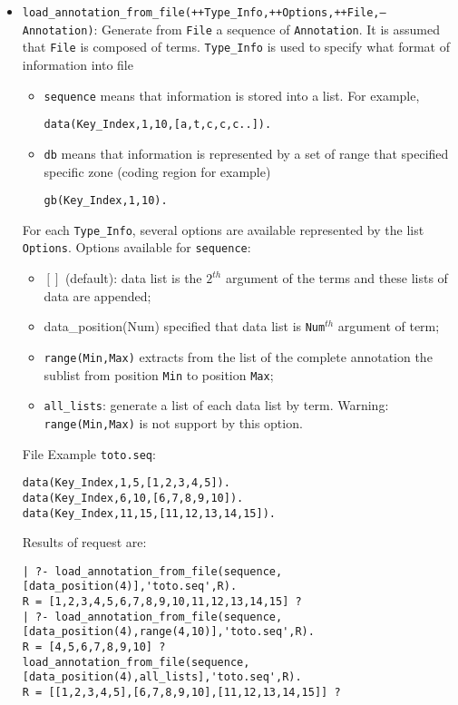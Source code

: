\documentclass{book}
\begin{document}
\begin{itemize}
\item \texttt{load\_annotation\_from\_file(++Type\_Info,++Options,++File,--Annotation)}:
Generate from \texttt{File} a sequence of \texttt{Annotation}. It is assumed that \texttt{File} is composed
of terms. \texttt{Type\_Info} is used to specify what format of information into file
\begin{itemize}
\item \texttt{sequence} means that information is stored into a list. For example, 
\begin{verbatim}
data(Key_Index,1,10,[a,t,c,c,c..]).
\end{verbatim}
\item \texttt{db} means that information is represented by a set of range that specified specific zone (coding region for example)
\begin{verbatim}
gb(Key_Index,1,10).
\end{verbatim}
\end{itemize}
For each \texttt{Type\_Info}, several options are available represented by the list \texttt{Options}. Options available
for \texttt{sequence}:
\begin{itemize}
\item $[]$ (default): data list is the $2^{th}$ argument of the terms and these lists of data are appended;
\item data\_position(Num) specified that data list is \texttt{Num}$^{th}$ argument of term;
\item \texttt{range(Min,Max)} extracts from the list of the complete annotation the sublist from position \texttt{Min} to
position \texttt{Max};
\item \texttt{all\_lists}: generate a list of each data list by term. Warning: \texttt{range(Min,Max)} is not support by this option.
\end{itemize}
File Example \texttt{toto.seq}:
\begin{verbatim}
data(Key_Index,1,5,[1,2,3,4,5]).
data(Key_Index,6,10,[6,7,8,9,10]).
data(Key_Index,11,15,[11,12,13,14,15]).
\end{verbatim}
Results of request are:
\begin{verbatim}
| ?- load_annotation_from_file(sequence,[data_position(4)],'toto.seq',R).
R = [1,2,3,4,5,6,7,8,9,10,11,12,13,14,15] ?
| ?- load_annotation_from_file(sequence,[data_position(4),range(4,10)],'toto.seq',R).
R = [4,5,6,7,8,9,10] ?
load_annotation_from_file(sequence,[data_position(4),all_lists],'toto.seq',R).
R = [[1,2,3,4,5],[6,7,8,9,10],[11,12,13,14,15]] ?
\end{verbatim}


\end{itemize}
\end{document}
